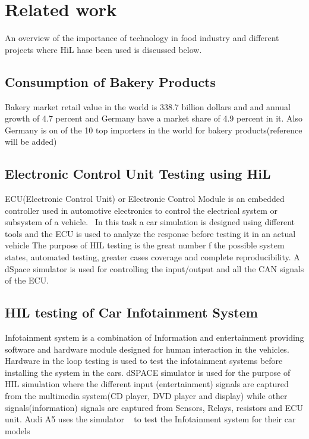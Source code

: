 \documentclass{listhesis}
\begin{document}
 

\section{Related work}
An overview of the importance of technology in food industry and different projects where HiL hase been used is discussed below.

\subsection{Consumption of Bakery Products}
Bakery market retail value in the world is 338.7 billion dollars and and annual growth of 4.7 percent and Germany have a market share of 4.9 percent in it. Also Germany is on of the 10 top importers in the world for bakery products(reference will be added)
\\

\subsection{Electronic Control Unit Testing using HiL}
ECU(Electronic Control Unit) or Electronic Control Module is an embedded controller used in automotive electronics to control the electrical system or subsystem of a vehicle. ~\cite{ecuhil}In this task a car simulation is designed using different tools and the ECU is used to analyze the response before testing it in an actual vehicle The purpose of HIL testing is the great number f the possible system states, automated testing, greater cases coverage and complete reproducibility. A dSpace simulator is used for controlling the input/output and all the CAN signals of the ECU. \\

\subsection{HIL testing of Car Infotainment System}
Infotainment system is a combination of Information and entertainment providing software and hardware module designed for human interaction in the vehicles. Hardware in the loop testing is used to test the infotainment systems before installing the system in the cars. dSPACE simulator is used for the purpose of HIL simulation where the different input (entertainment) signals are captured from the multimedia system(CD player, DVD player and display) while other signals(information) signals are captured from Sensors, Relays, resistors and ECU unit. Audi A5 uses the simulator ~\cite{infotainment} to test the Infotainment system for their car models\\
\end{document}
